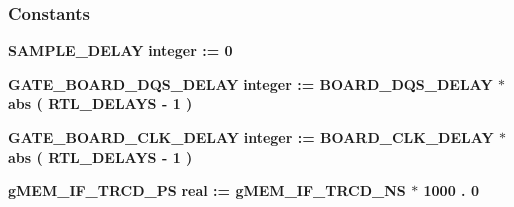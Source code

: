 \subsubsection*{Constants}
 \begin{DoxyCompactItemize}
\item 
{\bf S\+A\+M\+P\+L\+E\+\_\+\+D\+E\+L\+AY} {\bfseries \textcolor{comment}{integer}\textcolor{vhdlchar}{ }\textcolor{vhdlchar}{ }\textcolor{vhdlchar}{\+:}\textcolor{vhdlchar}{=}\textcolor{vhdlchar}{ }\textcolor{vhdlchar}{ } \textcolor{vhdldigit}{0} \textcolor{vhdlchar}{ }} 
\item 
{\bf G\+A\+T\+E\+\_\+\+B\+O\+A\+R\+D\+\_\+\+D\+Q\+S\+\_\+\+D\+E\+L\+AY} {\bfseries \textcolor{comment}{integer}\textcolor{vhdlchar}{ }\textcolor{vhdlchar}{ }\textcolor{vhdlchar}{\+:}\textcolor{vhdlchar}{=}\textcolor{vhdlchar}{ }\textcolor{vhdlchar}{ }\textcolor{vhdlchar}{ }\textcolor{vhdlchar}{ }{\bfseries {\bf B\+O\+A\+R\+D\+\_\+\+D\+Q\+S\+\_\+\+D\+E\+L\+AY}} \textcolor{vhdlchar}{$\ast$}\textcolor{keywordflow}{abs}\textcolor{vhdlchar}{ }\textcolor{vhdlchar}{(}\textcolor{vhdlchar}{ }\textcolor{vhdlchar}{ }\textcolor{vhdlchar}{ }\textcolor{vhdlchar}{ }{\bfseries {\bf R\+T\+L\+\_\+\+D\+E\+L\+A\+YS}} \textcolor{vhdlchar}{-\/}\textcolor{vhdlchar}{ } \textcolor{vhdldigit}{1} \textcolor{vhdlchar}{ }\textcolor{vhdlchar}{)}\textcolor{vhdlchar}{ }} 
\item 
{\bf G\+A\+T\+E\+\_\+\+B\+O\+A\+R\+D\+\_\+\+C\+L\+K\+\_\+\+D\+E\+L\+AY} {\bfseries \textcolor{comment}{integer}\textcolor{vhdlchar}{ }\textcolor{vhdlchar}{ }\textcolor{vhdlchar}{\+:}\textcolor{vhdlchar}{=}\textcolor{vhdlchar}{ }\textcolor{vhdlchar}{ }\textcolor{vhdlchar}{ }\textcolor{vhdlchar}{ }{\bfseries {\bf B\+O\+A\+R\+D\+\_\+\+C\+L\+K\+\_\+\+D\+E\+L\+AY}} \textcolor{vhdlchar}{$\ast$}\textcolor{keywordflow}{abs}\textcolor{vhdlchar}{ }\textcolor{vhdlchar}{(}\textcolor{vhdlchar}{ }\textcolor{vhdlchar}{ }\textcolor{vhdlchar}{ }\textcolor{vhdlchar}{ }{\bfseries {\bf R\+T\+L\+\_\+\+D\+E\+L\+A\+YS}} \textcolor{vhdlchar}{-\/}\textcolor{vhdlchar}{ } \textcolor{vhdldigit}{1} \textcolor{vhdlchar}{ }\textcolor{vhdlchar}{)}\textcolor{vhdlchar}{ }} 
\item 
{\bf g\+M\+E\+M\+\_\+\+I\+F\+\_\+\+T\+R\+C\+D\+\_\+\+PS} {\bfseries \textcolor{comment}{real}\textcolor{vhdlchar}{ }\textcolor{vhdlchar}{ }\textcolor{vhdlchar}{\+:}\textcolor{vhdlchar}{=}\textcolor{vhdlchar}{ }\textcolor{vhdlchar}{ }\textcolor{vhdlchar}{ }\textcolor{vhdlchar}{ }{\bfseries {\bf g\+M\+E\+M\+\_\+\+I\+F\+\_\+\+T\+R\+C\+D\+\_\+\+NS}} \textcolor{vhdlchar}{$\ast$}\textcolor{vhdlchar}{ } \textcolor{vhdldigit}{1000} \textcolor{vhdlchar}{.} \textcolor{vhdldigit}{0} \textcolor{vhdlchar}{ }} 

\end{DoxyCompactItemize}
